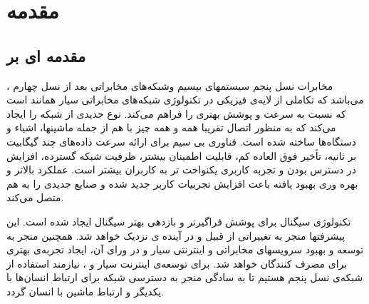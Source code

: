 \chapter{مقدمه}
\section{مقدمه ای بر  }
،
مخابرات نسل پنجم
سیستمهای بیسیم  وشبکه‌های مخابراتی بعد از نسل چهارم می‌باشد که تکاملی از لایه‌ی فیزیکی در تکنولوژی شبکه‌های مخابراتی سیار همانند  است که نسبت به  سرعت و پوشش بهتری را فراهم می‌کند.  
نوع جدیدی از شبکه را ایجاد می‌کند که به منظور اتصال تقریبا همه و همه چیز با هم از جمله ماشینها، اشیاء و دستگاه‌ها ساخته شده است.
 فناوری بی سیم برای ارائه سرعت داده‌های چند گیگابیت بر ثانیه، تأخیر فوق العاده کم، قابلیت اطمینان بیشتر، ظرفیت شبکه گسترده، افزایش در دسترس بودن و تجربه کاربری یکنواخت تر به کاربران بیشتر است. عملکرد بالاتر و بهره وری بهبود یافته باعث افزایش تجربیات کاربر جدید شده و صنایع جدیدی را به هم متصل می‌کند.
 
 
تکنولوژی سیگنال   برای پوشش فراگیرتر و بازدهی بهتر سیگنال ایجاد شده است. این پیشرفتها منجر به تغییراتی از قبیل  و  در آینده ی نزدیک خواهد شد.
همچنین  منجر به توسعه و بهبود سرویسهای مخابراتی و اینترنتی سیار و در ورای آن، ایجاد تجربه‌ی بهتری برای مصرف کنندگان خواهد شد.\newline
برای توسعه‌ی اینترنت سیار و ، نیازمند استفاده از شبکه‌ی نسل پنجم هستیم تا به سادگی منجر به دسترسی شبکه برای ارتباط انسان‌ها با یکدیگر و ارتباط ماشین با انسان گردد.


